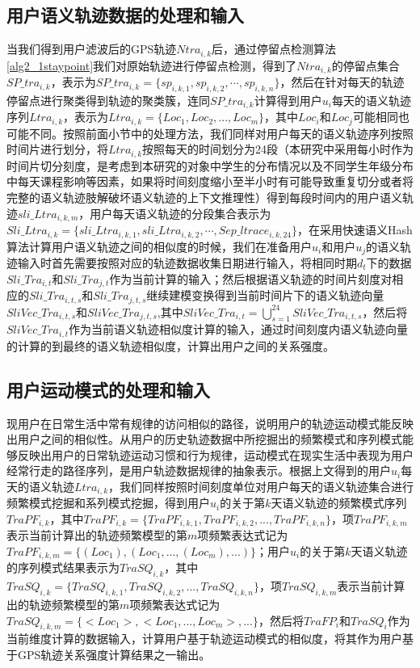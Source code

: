 \subsection{用户语义轨迹数据的处理和输入}
当我们得到用户滤波后的GPS轨迹$Ntra_{i,k}$后，通过停留点检测算法\ref{alg2_1staypoint}我们对原始轨迹进行停留点检测，得到了$Ntra_{i,k}$的停留点集合$SP\_tra_{i,k}$，表示为$SP\_tra_{i,k}=\{ sp_{i,k,1},sp_{i,k,2},\cdots , sp_{i,k,n} \}$，然后在针对每天的轨迹停留点进行聚类得到轨迹的聚类簇，连同$SP\_tra_{i,k}$计算得到用户$u_{i}$每天的语义轨迹序列$Ltra_{i,k}$，表示为$ Ltra_{i,k}=\{Loc_{1},Loc_{2},...,Loc_{m}\}$，其中$Loc_{i}$和$Loc_{j}$可能相同也可能不同。按照前面小节中的处理方法，我们同样对用户每天的语义轨迹序列按照时间片进行划分，将$ Ltra_{i,k}$按照每天的时间划分为24段（本研究中采用每小时作为时间片切分刻度，是考虑到本研究的对象中学生的分布情况以及不同学生年级分布中每天课程影响等因素，如果将时间刻度缩小至半小时有可能导致重复切分或者将完整的语义轨迹肢解破坏语义轨迹的上下文推理性）得到每段时间内的用户语义轨迹$sli\_Ltra_{i,k,m}$，用户每天语义轨迹的分段集合表示为$Sli\_Ltra_{i,k}=\{sli\_Ltra_{i,k,1},sli\_Ltra_{i,k,2},\cdots,Sep\_ltrace_{i,k,24}\}$，在采用快速语义Hash算法计算用户语义轨迹之间的相似度的时候，我们在准备用户$u_{i}$和用户$u_{j}$的语义轨迹输入时首先需要按照对应的轨迹数据收集日期进行输入，将相同时期$d_{t}$下的数据$Sli\_Tra_{i,t}$和$Sli\_Tra_{j,t}$作为当前计算的输入；然后根据语义轨迹的时间片刻度对相应的$Sli\_Tra_{i,t,s}$和$Sli\_Tra_{j,t,s}$继续建模变换得到当前时间片下的语义轨迹向量$SliVec\_Tra_{i,t,s}$和$SliVec\_Tra_{j,t,s}$,其中$SliVec\_Tra_{i,t}=\bigcup_{s=1}^{24}SliVec\_Tra_{i,t,s}$，然后将$SliVec\_Tra_{i,t}$作为当前语义轨迹相似度计算的输入，通过时间刻度内语义轨迹向量的计算的到最终的语义轨迹相似度，计算出用户之间的关系强度。
\subsection{用户运动模式的处理和输入}
现用户在日常生活中常有规律的访问相似的路径，说明用户的轨迹运动模式能反映出用户之间的相似性。从用户的历史轨迹数据中所挖掘出的频繁模式和序列模式能够反映出用户的日常轨迹运动习惯和行为规律，运动模式在现实生活中表现为用户经常行走的路径序列，是用户轨迹数据规律的抽象表示。根据上文得到的用户$u_{i}$每天的语义轨迹$Ltra_{i,k}$，我们同样按照时间刻度单位对用户每天的语义轨迹集合进行频繁模式挖掘和系列模式挖掘，得到用户$u_{i}$的关于第$k$天语义轨迹的频繁模式序列$TraPF_{i,k}$，其中$TraPF_{i,k}=\{ TraPF_{i,k,1},TraPF_{i,k,2},...,TraPF_{i,k,n} \}$，项$TraPF_{i,k,m}$表示当前计算出的轨迹频繁模型的第$m$项频繁表达式记为$TraPF_{i,k,m}=\{  (Loc_{1}),(Loc_{1},...,(Loc_{m}),...)  \}$；用户$u_{i}$的关于第$k$天语义轨迹的序列模式结果表示为$TraSQ_{i,k}$，其中$TraSQ_{i,k}=\{ TraSQ_{i,k,1},TraSQ_{i,k,2},...,TraSQ_{i,k,n} \}$，项$TraSQ_{i,k,m}$表示当前计算出的轨迹频繁模型的第$m$项频繁表达式记为$TraSQ_{i,k,m}=\{  <Loc_{1}>,< Loc_{1},...,Loc_{m}>,...\}$，然后将$TraFP_{i}$和$TraSQ_{i}$作为当前维度计算的数据输入，计算用户基于轨迹运动模式的相似度，将其作为用户基于GPS轨迹关系强度计算结果之一输出。
